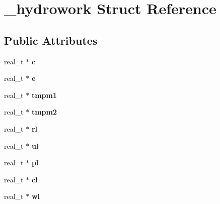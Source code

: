 \hypertarget{struct__hydrowork}{}\section{\+\_\+hydrowork Struct Reference}
\label{struct__hydrowork}
\subsection*{Public Attributes}
\begin{DoxyCompactItemize}
\item 
\hypertarget{struct__hydrowork_a84e284734aa6ef3bab2a3565a22e33f8}{}real\+\_\+t $\ast$ {\bfseries c}\label{struct__hydrowork_a84e284734aa6ef3bab2a3565a22e33f8}

\item 
\hypertarget{struct__hydrowork_a74898a3baf9031461c0cf4541d86d49a}{}real\+\_\+t $\ast$ {\bfseries e}\label{struct__hydrowork_a74898a3baf9031461c0cf4541d86d49a}

\item 
\hypertarget{struct__hydrowork_ace3ed3b05dfa664d76990469f93ebf98}{}real\+\_\+t $\ast$ {\bfseries tmpm1}\label{struct__hydrowork_ace3ed3b05dfa664d76990469f93ebf98}

\item 
\hypertarget{struct__hydrowork_afdd20f2eee191a1396796f9ab4f2bb9f}{}real\+\_\+t $\ast$ {\bfseries tmpm2}\label{struct__hydrowork_afdd20f2eee191a1396796f9ab4f2bb9f}

\item 
\hypertarget{struct__hydrowork_a7821e0de576f731a6178cfb156b785d3}{}real\+\_\+t $\ast$ {\bfseries rl}\label{struct__hydrowork_a7821e0de576f731a6178cfb156b785d3}

\item 
\hypertarget{struct__hydrowork_a32f734586785ac287cb1f6f2774d678e}{}real\+\_\+t $\ast$ {\bfseries ul}\label{struct__hydrowork_a32f734586785ac287cb1f6f2774d678e}

\item 
\hypertarget{struct__hydrowork_ab4102585f45d6890b468113eae11d0fa}{}real\+\_\+t $\ast$ {\bfseries pl}\label{struct__hydrowork_ab4102585f45d6890b468113eae11d0fa}

\item 
\hypertarget{struct__hydrowork_a23393786a5581b7a9334ede839df7147}{}real\+\_\+t $\ast$ {\bfseries cl}\label{struct__hydrowork_a23393786a5581b7a9334ede839df7147}

\item 
\hypertarget{struct__hydrowork_a0dcd170ed8bc6d8c7281bf2f7efd66b8}{}real\+\_\+t $\ast$ {\bfseries wl}\label{struct__hydrowork_a0dcd170ed8bc6d8c7281bf2f7efd66b8}


\end{DoxyCompactItemize}
